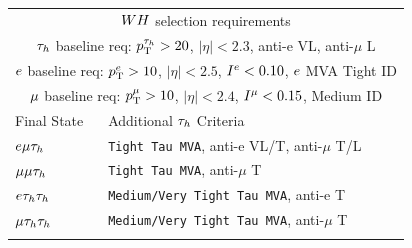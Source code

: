 \begin{table}[htbp]
\centering
\begin{small}
\begin{tabular}{ll}
     \multicolumn{2}{c}{$WH$ selection requirements}                 \\ 
     \multicolumn{2}{c}{$\tau_{h}$ baseline req: $p_\mathrm{T}^{\tau_{h}}>20$, $|\eta|<2.3$, anti-e VL, anti-$\mu$ L}    \\
     \multicolumn{2}{c}{$e$ baseline req: $p_\mathrm{T}^{e}>10$, $|\eta|<2.5$, $I^{e}<0.10$, $e$ MVA Tight ID}                 \\ 
     \multicolumn{2}{c}{$\mu$ baseline req: $p_\mathrm{T}^{\mu}>10$, $|\eta|<2.4$, $I^{\mu}<0.15$, Medium ID}          \\
\hline
  Final State            &      Additional $\tau_{h}$ Criteria  \\
\hline
 $e\mu\tau_{h}$      &   \texttt{Tight Tau MVA}, anti-e VL/T, anti-$\mu$ T/L             \\
 $\mu\mu\tau_{h}$     &   \texttt{Tight Tau MVA}, anti-$\mu$ T             \\
 $e\tau_{h}\tau_{h}$     &   \texttt{Medium/Very Tight Tau MVA}, anti-e T \\
 $\mu\tau_{h}\tau_{h}$    &   \texttt{Medium/Very Tight Tau MVA}, anti-$\mu$ T \\
\hline \\


\end{tabular}
\end{small}
\end{table}

